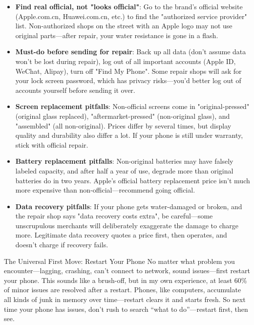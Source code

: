 \begin{itemize}
  \item \textbf{Find real official, not "looks official"}: Go to the brand's official website (Apple.com.cn, Huawei.com.cn, etc.) to find the "authorized service provider" list. Non-authorized shops on the street with an Apple logo may not use original parts—after repair, your water resistance is gone in a flash.
  \item \textbf{Must-do before sending for repair}: Back up all data (don't assume data won't be lost during repair), log out of all important accounts (Apple ID, WeChat, Alipay), turn off "Find My Phone". Some repair shops will ask for your lock screen password, which has privacy risks—you'd better log out of accounts yourself before sending it over.
  \item \textbf{Screen replacement pitfalls}: Non-official screens come in "original-pressed" (original glass replaced), "aftermarket-pressed" (non-original glass), and "assembled" (all non-original). Prices differ by several times, but display quality and durability also differ a lot. If your phone is still under warranty, stick with official repair.
  \item \textbf{Battery replacement pitfalls}: Non-original batteries may have falsely labeled capacity, and after half a year of use, degrade more than original batteries do in two years. Apple's official battery replacement price isn't much more expensive than non-official—recommend going official.
  \item \textbf{Data recovery pitfalls}: If your phone gets water-damaged or broken, and the repair shop says "data recovery costs extra", be careful—some unscrupulous merchants will deliberately exaggerate the damage to charge more. Legitimate data recovery quotes a price first, then operates, and doesn't charge if recovery fails.
\end{itemize}

\begin{tcbwarn}{The Universal First Move: Restart Your Phone}
No matter what problem you encounter—lagging, crashing, can't connect to network, sound issues—first restart your phone. This sounds like a brush-off, but in my own experience, at least 60\% of minor issues are resolved after a restart. Phones, like computers, accumulate all kinds of junk in memory over time—restart clears it and starts fresh. So next time your phone has issues, don't rush to search “what to do”—restart first, then see.

\end{tcbwarn}

